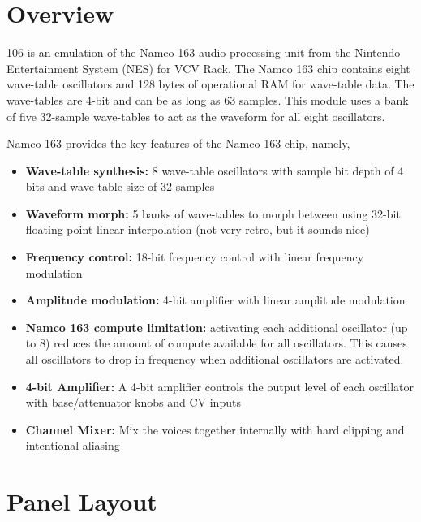\documentclass[12pt,letter]{article}
\begin{document}


\section*{Overview}

106 is an emulation of the Namco 163 audio processing unit from the Nintendo Entertainment System (NES) for VCV Rack. The Namco 163 chip contains eight wave-table oscillators and 128 bytes of operational RAM for wave-table data. The wave-tables are 4-bit and can be as long as 63 samples. This module uses a bank of five 32-sample wave-tables to act as the waveform for all eight oscillators.

Namco 163 provides the key features of the Namco 163 chip, namely,
\begin{itemize}
  \item \textbf{Wave-table synthesis:} 8 wave-table oscillators with sample bit depth of 4 bits and wave-table size of 32 samples
  \item \textbf{Waveform morph:} 5 banks of wave-tables to morph between using 32-bit floating point linear interpolation (not very retro, but it sounds nice)
  \item \textbf{Frequency control:} 18-bit frequency control with linear frequency modulation
  \item \textbf{Amplitude modulation:} 4-bit amplifier with linear amplitude modulation
  \item \textbf{Namco 163 compute limitation:} activating each additional oscillator (up to 8) reduces the amount of compute available for all oscillators. This causes all oscillators to drop in frequency when additional oscillators are activated.

  \item \textbf{4-bit Amplifier:} A 4-bit amplifier controls the output level of each oscillator with base/attenuator knobs and CV inputs
  \item \textbf{Channel Mixer:} Mix the voices together internally with hard clipping and intentional aliasing
\end{itemize}


\clearpage
\section*{Panel Layout}
\end{document}
